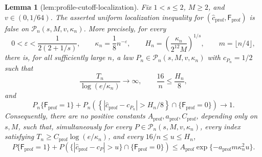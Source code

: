 \documentclass{article}
\newtheorem{lemma}{Lemma}
\begin{document}
\begin{lemma}[lem:profile-cutoff-localization]\label{lem:profile-cutoff-localization}
Fix \(1<s\le2\), \(M\ge2\), and \(v\in(0,1/64)\).  The asserted
uniform localization inequality for
\((\widehat c_{\mathrm{prof}},\mathsf F_{\mathrm{prof}})\) is false on
\(\mathcal P_n(s,M,v,\kappa_n)\).  More precisely, for every
\[
 0<\varepsilon<\frac{1}{2(2+1/s)},
 \qquad \kappa_n=\frac18n^{-\varepsilon},
 \qquad H_n=\left(\frac{\kappa_n}{2^{12}M}\right)^{1/s},
 \qquad m=\lfloor n/4\rfloor,
\]
there is, for all sufficiently large \(n\), a law
\(P_n\in\mathcal P_n(s,M,v,\kappa_n)\) with \(c_{P_n}=1/2\) such that
\[
 \frac{T_n}{\log(e/\kappa_n)}\longrightarrow\infty,
 \qquad \frac{16}{n}\le\frac{H_n}{8},
\]
and
\[
 P_n\{\mathsf F_{\mathrm{prof}}=1\}
 +P_n\!\left(\left\{|\widehat c_{\mathrm{prof}}-c_{P_n}|>
                    H_n/8\right\}
       \cap\{\mathsf F_{\mathrm{prof}}=0\}\right)
 \longrightarrow1.
\]
Consequently, there are no positive constants
\(A_{\mathrm{prof}},a_{\mathrm{prof}},C_{\mathrm{prof}}\), depending
only on \(s,M\), such that, simultaneously for every
\(P\in\mathcal P_n(s,M,v,\kappa_n)\), every index satisfying
\(T_n\ge C_{\mathrm{prof}}\log(e/\kappa_n)\), and every
\(16/n\le u\le H_n\),
\[
 P\{\mathsf F_{\mathrm{prof}}=1\}
 +P\!\left(\{|\widehat c_{\mathrm{prof}}-c_P|>u\}
       \cap\{\mathsf F_{\mathrm{prof}}=0\}\right)
 \le A_{\mathrm{prof}}\exp\{-a_{\mathrm{prof}}m\kappa_n^2u\}.
\]
\end{lemma}
\end{document}
